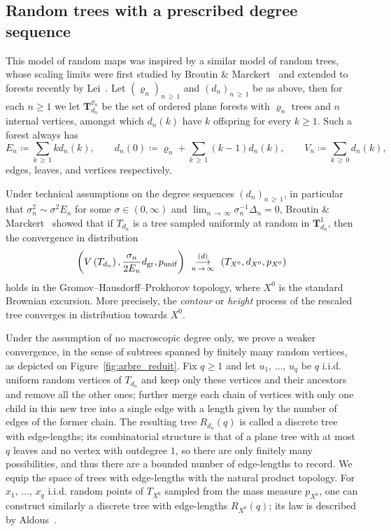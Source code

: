 \documentclass[AHL,Unicode,longabstracts,published]{cedram}
\newcommand{\1}{\ensembles{1}}
\newcommand{\Tree}{\mathbf{T}}
\renewcommand{\ge}{\geqslant}
\newcommand{\Rmap}{R}
\newcommand{\CRT}{T}
\newcommand{\dCRT}{d}
\newcommand{\pCRT}{p}
\newcommand{\dgr}{d_{\mathrm{gr}}}
\newcommand{\pgr}{p_{\mathrm{unif}}}
\newcommand{\tn}{T_{d_n}}
\newcommand{\edges}{E}
\newcommand{\vertices}{V}
\newcommand{\cvloi}[1][n]{\enskip\mathop{\longrightarrow}^{(d)}_{#1\,\to\, \infty}\enskip}
\begin{document}
\subsection{Random trees with a prescribed degree sequence}\label{sec:intro_arbres}

This model of random maps was inspired by a similar model of random trees, whose scaling limits were first studied by Broutin \& Marckert~\cite{BM14} and extended to forests recently by Lei~\cite{Lei19}. Let $(\varrho_n)_{n\,\ge\,1}$ and $(d_n)_{n\,\ge\, 1}$ be as above, then for each $n \ge 1$ we let $\Tree_{d_n}^{\varrho_n}$ be the set of ordered plane forests with $\varrho_n$ trees and $n$ internal vertices, amongst which $d_n(k)$ have $k$ offspring for every $k \ge 1$. Such a forest always has
\[
\edges_n \coloneqq \sum_{k\,\ge\,1} k d_n(k),
\qquad d_n(0) \coloneqq \varrho_n + \sum_{k\, \ge\,1} (k-1) d_n(k),
\qquad
\vertices_n \coloneqq \sum_{k\,\ge\,0} d_n(k),
\]
edges, leaves, and vertices respectively.


Under technical assumptions on the degree sequences $(d_n)_{n\,\ge\,1}$, in particular that $\sigma_n^2 \sim \sigma^2 E_n$ for some $\sigma \in (0,\infty)$ and $\lim_{n\,\to \,\infty} \sigma_n^{-1} \Delta_n = 0$, Broutin \& Marckert~\cite{BM14} showed that if $\tn$ is a tree sampled uniformly at random in $\Tree_{d_n}^1$, then the convergence in distribution
\begin{equation}\label{eq:convergence_arbres_BM}
\left(V\left(\tn\right), \frac{\sigma_n}{2 \edges_n} \dgr, \pgr\right) \cvloi \left(\CRT_{X^0}, \dCRT_{X^0}, \pCRT_{X^0}\right)
\end{equation}
holds in the Gromov--Hausdorff--Prokhorov topology, where $X^0$ is the standard Brownian excursion. More precisely, the \emph{contour} or \emph{height} process of the rescaled tree converges in distribution towards $X^{0}$.

Under the assumption of no macroscopic degree only, we prove a weaker convergence, in the sense of subtrees spanned by finitely many random vertices, as depicted on Figure~\ref{fig:arbre_reduit}. Fix $q \ge 1$ and let $u_1,\,\dots,\,u_q$ be $q$ i.i.d. uniform random vertices of $\tn$ and keep only these vertices and their ancestors and remove all the other ones; further merge each chain of vertices with only one child in this new tree into a single edge with a length given by the number of edges of the former chain. The resulting tree $\Rmap_{d_n}(q)$ is called a discrete tree with edge-lengths; its combinatorial structure is that of a plane tree with at most $q$ leaves and no vertex with outdegree $1$, so there are only finitely many possibilities, and thus there are a bounded number of edge-lengths to record. We equip the space of trees with edge-lengths with the natural product topology. For $x_1,\,\dots,\,x_q$ i.i.d. random points of $\CRT_{X^0}$ sampled from the mass measure $\pCRT_{X^0}$, one can construct similarly a discrete tree with edge-lengths $\Rmap_{X^0}(q)$; its law is described by Aldous~\cite[Section~4.3]{Ald93}.
\end{document}
